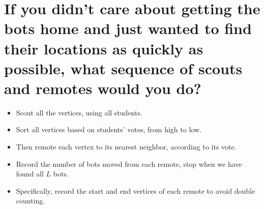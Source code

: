 \documentclass[10pt,a4paper]{article}
\begin{document}
\section{If you didn't care about getting the bots home 
and just wanted to find their locations as quickly as possible, 
what sequence of scouts and remotes would you do?}
\begin{itemize}
\item Scout all the vertices, using all students. 
\item Sort all vertices based on students' votes, from high to low. 
\item Then remote each vertex to its nearest neighbor, according to its vote.
\item Record the number of bots moved from each remote, stop when we have found all $L$ bots. 
\item Specifically, record the start and end vertices of each remote to avoid double counting.
\end{itemize}


\newpage
\end{document}

